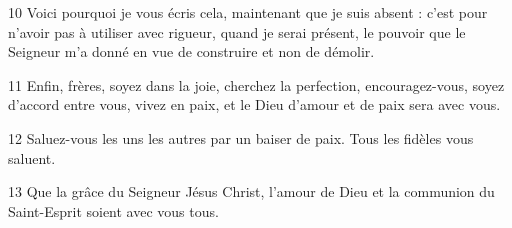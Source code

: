 
10 Voici pourquoi je vous écris cela, maintenant que je suis absent : c’est pour n’avoir pas à utiliser avec rigueur, quand je serai présent, le pouvoir que le Seigneur m’a donné en vue de construire et non de démolir.

11 Enfin, frères, soyez dans la joie, cherchez la perfection, encouragez-vous, soyez d’accord entre vous, vivez en paix, et le Dieu d’amour et de paix sera avec vous.

12 Saluez-vous les uns les autres par un baiser de paix. Tous les fidèles vous saluent.

13 Que la grâce du Seigneur Jésus Christ, l’amour de Dieu et la communion du Saint-Esprit soient avec vous tous.